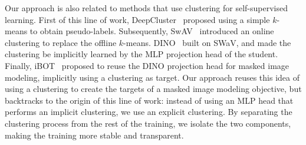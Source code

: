 Our approach is also related to methods that use clustering for self-supervised learning.
First of this line of work, DeepCluster~\citep{deepcluster} proposed using a simple $k$-means to obtain pseudo-labels.
Subsequently, SwAV~\citep{swav} introduced an online clustering to replace the offline $k$-means.
DINO~\citep{dino} built on SWaV, and made the clustering be implicitly learned by the MLP projection head of the student.
Finally, iBOT~\citep{ibot} proposed to reuse the DINO projection head for masked image modeling, implicitly using a clustering as target.
Our approach reuses this idea of using a clustering to create the targets of a masked image modeling objective, but backtracks to the origin of this line of work: instead of using an MLP head that performs an implicit clustering, we use an explicit clustering.
By separating the clustering process from the rest of the training, we isolate the two components, making the training more stable and transparent.

